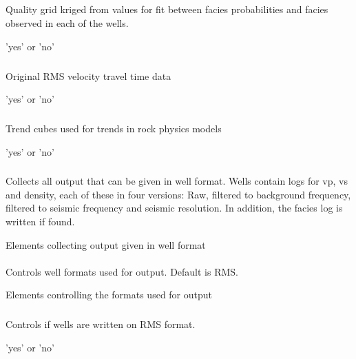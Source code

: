 \subparagraph{}
 \slist
   \item \Description Quality grid kriged from values for fit between facies probabilities and facies observed in each of the wells.
   \item \Argument 'yes' or 'no'
   \item \Default
\elist

\subparagraph{}
 \slist
   \item \Description Original RMS velocity travel time data
   \item \Argument 'yes' or 'no'
   \item \Default
\elist

\subparagraph{}
 \slist
   \item \Description Trend cubes used for trends in rock physics models
   \item \Argument 'yes' or 'no'
   \item \Default
\elist

\subsubsection{}
 \slist
   \item \Description Collects all output that can be given in well format. Wells contain logs for vp, vs and density, each of these in four versions: Raw, filtered to background frequency, filtered to seismic frequency and seismic resolution. In addition, the facies log is written if found.
   \item \Argument Elements collecting output given in well format
   \item \Default
 \elist

\paragraph{}
 \slist
   \item \Description Controls well formats used for output. Default is RMS.
   \item \Argument Elements controlling the formats used for output
   \item \Default
 \elist

\subparagraph{}
 \slist
   \item \Description Controls if wells are written on RMS format.
   \item \Argument 'yes' or 'no'
   \item \Default
 \elist

